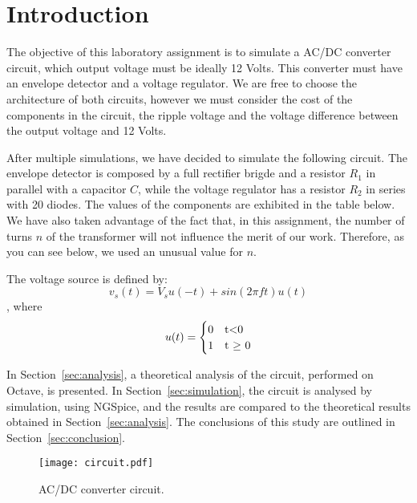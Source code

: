 \section{Introduction}
\label{sec:introduction}
The objective of this laboratory assignment is to simulate a AC/DC converter circuit, which output voltage must be ideally 12 Volts. 
This converter must have an envelope detector and a voltage regulator. We are free to choose the architecture of both circuits, 
however we must consider the cost of the components in the circuit, the ripple voltage and the voltage difference between the output 
voltage and 12 Volts.

After multiple simulations, we have decided to simulate the following circuit. The envelope detector is composed by
a full rectifier brigde and a resistor $R_1$ in parallel with a capacitor $C$, while the voltage regulator has a resistor $R_2$ in
series with 20 diodes. The values of the components are exhibited in the table below. We have also taken advantage of the fact that,
in this assignment, the number of turns $n$ of the transformer will not influence the merit of our work. Therefore, as you can see below,
we used an unusual value for $n$.



\par The voltage source is defined by:
\begin{equation}
v_s(t) = V_s u(-t) + sin(2 \pi f t)u(t)
\label {equation:voltsource}
\end{equation}
, where
\begin{equation}
u(t)=
\begin{cases}
0 & $t$ < $0$ \\
1 & $t $\geq$ 0$
\end{cases}
\label {eq:ut}
\end{equation}

In Section~\ref{sec:analysis}, a theoretical analysis of the circuit, 
performed on Octave, is presented. In Section~\ref{sec:simulation}, the 
circuit is analysed by simulation, using NGSpice, and the results are compared to 
the theoretical results obtained in Section~\ref{sec:analysis}. The conclusions 
of this study are outlined in Section~\ref{sec:conclusion}.

\begin{figure}[H] \centering
\texttt{[image: circuit.pdf]}
\caption{AC/DC converter circuit.}                                     %
\label{fig:circuit}
\end{figure}

